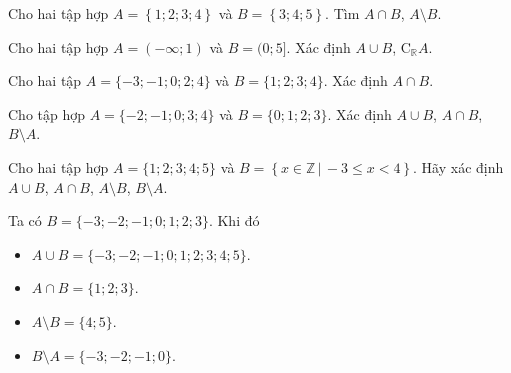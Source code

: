 \begin{bt}%
	\begin{listEX}[1]
		\item Cho hai tập hợp $A =\left\{1;2;3;4 \right\}$	và $B=\left\{3;4;5 \right\}$. Tìm $A \cap B$, $A \setminus B$.
		\item Cho hai tập hợp $A= (-\infty; 1)$ và $B=(0;5]$. Xác định $A \cup B$, $\mathrm C_{\mathbb{R}}A$.
	\end{listEX}
	
	\loigiai{\begin{listEX}[1]
			\item Ta có $A \cap B =\{3;4\}$ và $A \setminus B =\{1;2\}$.
			\item $A \cap B = (0;1)$ và $\mathrm C_{\mathbb{R}}A= [1; +\infty)$.	
		\end{listEX}
	}
\end{bt}

\begin{bt}%
	Cho hai tập $A=\{-3;-1;0;2;4\}$ và $B=\{1;2;3;4\}$. Xác định $A\cap B$.
\end{bt}

\begin{bt}%
Cho tập hợp $A=\{-2;-1;0;3;4\} $ và $B=\{0;1;2;3\}$. Xác định $A\cup B$, $A\cap B$, $B\setminus A$.
\end{bt}

\begin{bt}%
	Cho hai tập hợp $A=\{1;2;3;4;5\}$ và $B=\left \{x\in\mathbb{Z}\,|\,-3\le x<4 \right \}$. Hãy xác định $A\cup B$, $A\cap B$, $A\setminus B$, $B\setminus A$.
	\loigiai
	{
		Ta có $B=\{-3;-2;-1;0;1;2;3\}$. Khi đó
		\begin{itemize}
			\item $A\cup B=\{-3;-2;-1;0;1;2;3;4;5\}$.
			\item $A\cap B=\{1;2;3\}$.
			\item $A\setminus B=\{4;5\}$.
			\item $B\setminus A=\{-3;-2;-1;0\}$.
		\end{itemize}
	}
\end{bt}

